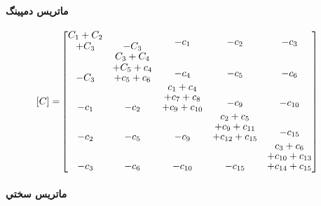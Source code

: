 \paragraph{ماتريس دمپينگ}

\begin{equation}\label{Eq.damping_matrix_dimensional_combined}
\begin{aligned}
[C] =& 
\begin{bmatrix}
\shortstack{$C_1 + C_2$ \\ $+ C_3$} & -C_3 & \shortstack{$-c_1$ \\ \,} & \shortstack{$-c_2$ \\ \,} & \shortstack{$-c_3$ \\ \,} \\
-C_3 & \shortstack{$C_3 + C_4$ \\ $+ C_5 + c_4$ \\ $+ c_5 + c_6$} & \shortstack{$-c_4$ \\ \,} & \shortstack{$-c_5$ \\ \,} & \shortstack{$-c_6$ \\ \,} \\
-c_1 & -c_2 & \shortstack{$c_1 + c_4$ \\ $+ c_7 + c_8$ \\ $+ c_9 + c_{10}$} & \shortstack{$-c_9$ \\ \,} & \shortstack{$-c_{10}$ \\ \,} \\
-c_2 & -c_5 & -c_9 & \shortstack{$c_2 + c_5$ \\ $+ c_9 + c_{11}$ \\ $+ c_{12} + c_{15}$} & \shortstack{$-c_{15}$ \\ \,} \\
-c_3 & -c_{6} & -c_{10} & -c_{15} & \shortstack{$c_3 + c_6$ \\ $+ c_{10} + c_{13}$ \\ $+ c_{14} + c_{15}$}
\end{bmatrix}
\end{aligned}
\end{equation}

\paragraph{ماتريس سختي}

